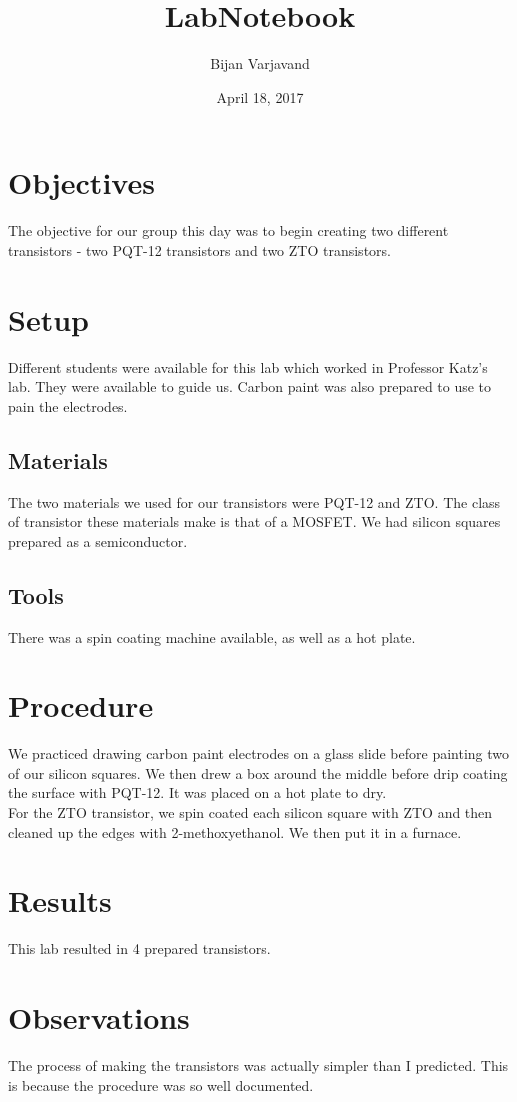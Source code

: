 \documentclass{article}
\author{Bijan Varjavand}
\title{LabNotebook}
\date{April 18, 2017}
\begin{document}
\maketitle

\section{Objectives}

The objective for our group this day was to begin creating two different transistors - two PQT-12 transistors and two ZTO transistors.

\section{Setup}

Different students were available for this lab which worked in Professor Katz's lab. They were available to guide us. Carbon paint was also prepared to use to pain the electrodes.

\subsection{Materials}

The two materials we used for our transistors were PQT-12 and ZTO. The class of transistor these materials make is that of a MOSFET. We had silicon squares prepared as a semiconductor.

\subsection{Tools}

There was a spin coating machine available, as well as a hot plate.

\section{Procedure}

We practiced drawing carbon paint electrodes on a glass slide before painting two of our silicon squares. We then drew a box around the middle before drip coating the surface with PQT-12. It was placed on a hot plate to dry.\\
For the ZTO transistor, we spin coated each silicon square with ZTO and then cleaned up the edges with 2-methoxyethanol. We then put it in a furnace.

\section{Results}

This lab resulted in 4 prepared transistors.

\section{Observations}

The process of making the transistors was actually simpler than I predicted. This is because the procedure was so well documented.
\end{document}
